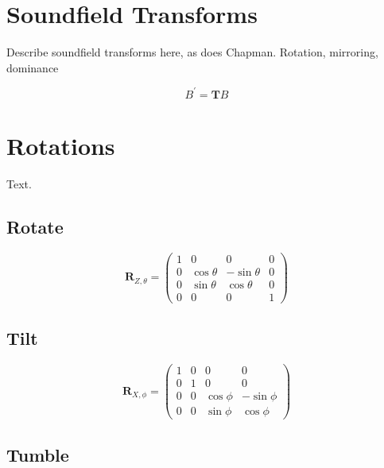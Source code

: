 \documentclass[12pt]{article}
\begin{document}


\section{Soundfield Transforms}

Describe soundfield transforms here, as does Chapman. Rotation, mirroring, dominance


\begin{equation}	\label{eq:trans}
	B^\prime = \mathbf{T} B
\end{equation}

\section{Rotations}

Text.

\subsection{Rotate}

\begin{equation}	\label{eq:rotate}
\mathbf{R}_{Z, \theta} = \begin{pmatrix}
	1 & 0 & 0 & 0\\
	0 & \cos{\theta} & -\sin{\theta} & 0\\
	0 & \sin{\theta} & \cos{\theta} & 0\\
	0 & 0 & 0 & 1
\end{pmatrix}
\end{equation}

\subsection{Tilt}

\begin{equation}	\label{eq:tilt}
\mathbf{R}_{X, \phi} = \begin{pmatrix}
	1 & 0 & 0 & 0\\
	0 & 1 & 0 & 0\\
	0 & 0& \cos{\phi} & -\sin{\phi}\\
	0 & 0& \sin{\phi} & \cos{\phi}
\end{pmatrix}
\end{equation}

\subsection{Tumble}
\end{document}
